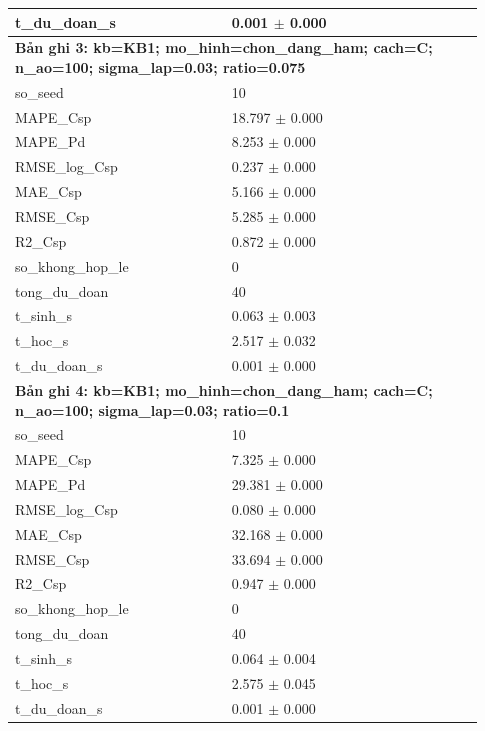 \begin{longtable}{p{0.43\linewidth}p{0.50\linewidth}}
t\_\allowbreak du\_\allowbreak doan\_\allowbreak s & 0.001 $\pm$ 0.000 \\
\midrule
\multicolumn{2}{p{0.95\linewidth}}{\textbf{Bản ghi 3: kb=KB1; mo\_hinh=chon\_dang\_ham; cach=C; n\_ao=100; sigma\_lap=0.03; ratio=0.075}} \\
so\_\allowbreak seed & 10 \\
MAPE\_\allowbreak Csp & 18.797 $\pm$ 0.000 \\
MAPE\_\allowbreak Pd & 8.253 $\pm$ 0.000 \\
RMSE\_\allowbreak log\_\allowbreak Csp & 0.237 $\pm$ 0.000 \\
MAE\_\allowbreak Csp & 5.166 $\pm$ 0.000 \\
RMSE\_\allowbreak Csp & 5.285 $\pm$ 0.000 \\
R2\_\allowbreak Csp & 0.872 $\pm$ 0.000 \\
so\_\allowbreak khong\_\allowbreak hop\_\allowbreak le & 0 \\
tong\_\allowbreak du\_\allowbreak doan & 40 \\
t\_\allowbreak sinh\_\allowbreak s & 0.063 $\pm$ 0.003 \\
t\_\allowbreak hoc\_\allowbreak s & 2.517 $\pm$ 0.032 \\
t\_\allowbreak du\_\allowbreak doan\_\allowbreak s & 0.001 $\pm$ 0.000 \\
\midrule
\multicolumn{2}{p{0.95\linewidth}}{\textbf{Bản ghi 4: kb=KB1; mo\_hinh=chon\_dang\_ham; cach=C; n\_ao=100; sigma\_lap=0.03; ratio=0.1}} \\
so\_\allowbreak seed & 10 \\
MAPE\_\allowbreak Csp & 7.325 $\pm$ 0.000 \\
MAPE\_\allowbreak Pd & 29.381 $\pm$ 0.000 \\
RMSE\_\allowbreak log\_\allowbreak Csp & 0.080 $\pm$ 0.000 \\
MAE\_\allowbreak Csp & 32.168 $\pm$ 0.000 \\
RMSE\_\allowbreak Csp & 33.694 $\pm$ 0.000 \\
R2\_\allowbreak Csp & 0.947 $\pm$ 0.000 \\
so\_\allowbreak khong\_\allowbreak hop\_\allowbreak le & 0 \\
tong\_\allowbreak du\_\allowbreak doan & 40 \\
t\_\allowbreak sinh\_\allowbreak s & 0.064 $\pm$ 0.004 \\
t\_\allowbreak hoc\_\allowbreak s & 2.575 $\pm$ 0.045 \\
t\_\allowbreak du\_\allowbreak doan\_\allowbreak s & 0.001 $\pm$ 0.000 \\

\end{longtable}
